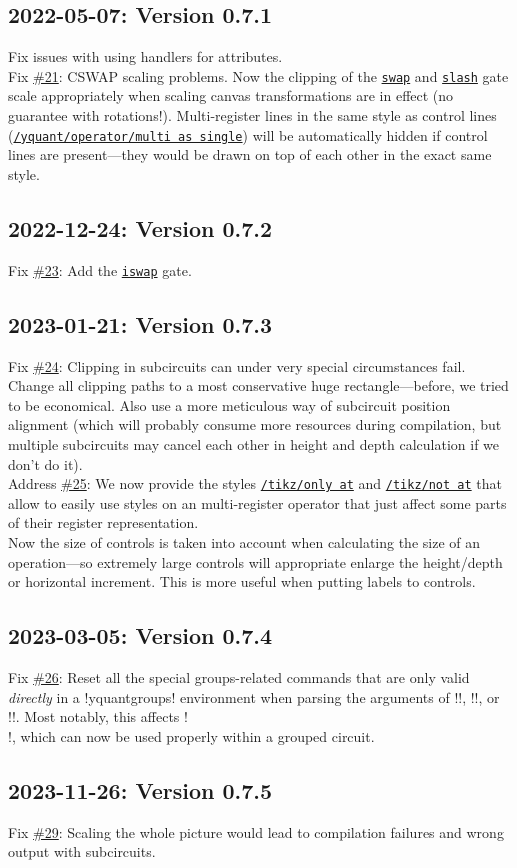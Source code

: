\documentclass{scrartcl}
\def\gate#1{\hyperref[gate:#1]{\texttt{#1}}}
\def\style#1{\hyperref[style:#1]{\texttt{#1}}}
\begin{document}
      \subsection*{2022-05-07: Version 0.7.1}
         Fix issues with using handlers for attributes. \\
         Fix \href{https://github.com/projekter/yquant/issues/21}{\#21}: CSWAP scaling problems. Now the clipping of the \gate{swap} and \gate{slash} gate scale appropriately when scaling canvas transformations are in effect (no guarantee with rotations!). Multi-register lines in the same style as control lines (\style{/yquant/operator/multi as single}) will be automatically hidden if control lines are present---they would be drawn on top of each other in the exact same style.

      \subsection*{2022-12-24: Version 0.7.2}
         Fix \href{https://github.com/projekter/yquant/issues/23}{\#23}: Add the \gate{iswap} gate.

      \subsection*{2023-01-21: Version 0.7.3}
         Fix \href{https://github.com/projekter/yquant/issues/24}{\#24}: Clipping in subcircuits can under very special circumstances fail. Change all clipping paths to a most conservative huge rectangle---before, we tried to be economical.
         Also use a more meticulous way of subcircuit position alignment (which will probably consume more resources during compilation, but multiple subcircuits may cancel each other in height and depth calculation if we don't do it). \\
         Address \href{https://github.com/projekter/yquant/issues/25}{\#25}: We now provide the styles \style{/tikz/only at} and \style{/tikz/not at} that allow to easily use styles on an multi\hyp register operator that just affect some parts of their register representation. \\
         Now the size of controls is taken into account when calculating the size of an operation---so extremely large controls will appropriate enlarge the height/depth or horizontal increment.
         This is more useful when putting labels to controls.

      \subsection*{2023-03-05: Version 0.7.4}
         Fix \href{https://github.com/projekter/yquant/issues/26}{\#26}: Reset all the special groups\hyp related commands that are only valid \emph{directly} in a \tex!yquantgroups! environment when parsing the arguments of \tex!\registers!, \tex!\circuit!, or \tex!\equals!.
         Most notably, this affects \tex!\\!, which can now be used properly within a grouped circuit.

      \subsection*{2023-11-26: Version 0.7.5}
         Fix \href{https://github.com/projekter/yquant/issues/29}{\#29}: Scaling the whole picture would lead to compilation failures and wrong output with subcircuits.
\end{document}
